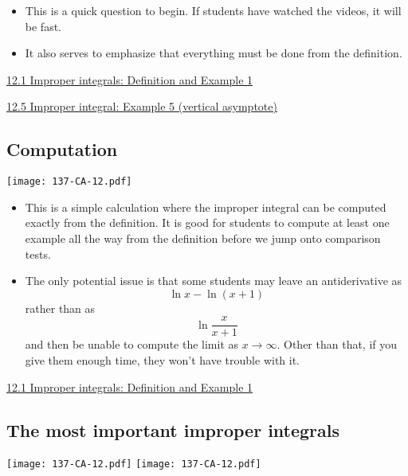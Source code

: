 \documentclass[11pt]{article}
\newcommand{\nl}{\hfill \vspace{-1.1\baselineskip}} %
\newcommand{\vi}{\hspace{8mm} \href{https://www.youtube.com/watch?v=NqxwJ2D-Ckc&list=PLlwePzQY_wW-OVbBuwbFDl8RB5kt2Tngo}{12.1 Improper integrals: Definition and Example 1}}
\newcommand{\vv}{\hspace{8mm} \href{https://www.youtube.com/watch?v=l0bYj2g9qqM&list=PLlwePzQY_wW-OVbBuwbFDl8RB5kt2Tngo&index=5}{12.5 Improper integral: Example 5 (vertical asymptote)}}
\begin{document}
\begin{comments}
\nl
	\begin{itemize}
		\item   This is a quick question to begin.  If students have watched the videos, it will be fast.
		\item It also serves to emphasize that everything must be done from the definition.
	\end{itemize}
\end{comments}

\begin{videos}
\vi

\vv
\end{videos}

\newpage
\subsection{Computation}

\begin{center}
{ \texttt{[image: 137-CA-12.pdf]}} 
\end{center}

\begin{comments}
\nl
	\begin{itemize}
		\item This is a simple calculation where the improper integral can be computed exactly from the definition.  It is good for students to compute at least one example all the way from the definition before we jump onto comparison tests.  
		\item The only potential issue is that some students may leave an antiderivative as
			$$
				\ln x - \ln (x+1)
			$$
			rather than as
			$$
				\ln \frac{x}{x+1}
			$$
			and then be unable to compute the limit as $x \to \infty$.  Other than that, if you give them enough time, they won't have trouble with it.
	\end{itemize}
\end{comments}

\begin{videos}
\vi
\end{videos}

\newpage
\subsection{The most important improper integrals}

\begin{center}
{ \texttt{[image: 137-CA-12.pdf]}}  \quad
{ \texttt{[image: 137-CA-12.pdf]}} 
\end{center}
\end{document}
